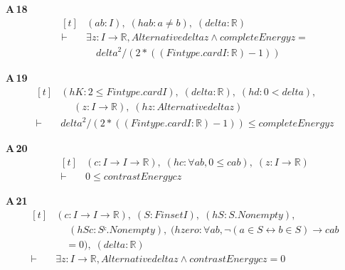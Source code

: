 \noindent\textbf{A\,18}\quad{}
{\footnotesize\[ \begin{aligned}[t]
&(\mathit{a} \mathit{b} : \mathit{I}),\; (\mathit{hab} : \mathit{a} \neq \mathit{b}),\; (\mathit{delta} : \mathbb{R} )\\
\vdash\;&\exists \mathit{z} : \mathit{I} \to \mathbb{R} ,\mathit{Alternative} \mathit{delta} \mathit{z} \wedge \mathit{completeEnergy} \mathit{z}=\\
&\quad \mathit{delta}^{2}/(2*((\mathit{Fintype}.\mathit{card} \mathit{I}:\mathbb{R} )-1))
\end{aligned} \]}

\noindent\textbf{A\,19}\quad{}
{\footnotesize\[ \begin{aligned}[t]
&(\mathit{hK} : 2 \leq \mathit{Fintype}.\mathit{card} \mathit{I}),\; (\mathit{delta} : \mathbb{R} ),\; (\mathit{hd} : 0 < \mathit{delta}),\\
&\quad \; (\mathit{z} : \mathit{I} \to \mathbb{R} ),\; (\mathit{hz} : \mathit{Alternative} \mathit{delta} \mathit{z})\\
\vdash\;&\mathit{delta}^{2}/(2*((\mathit{Fintype}.\mathit{card} \mathit{I}:\mathbb{R} )-1)) \leq \mathit{completeEnergy} \mathit{z}
\end{aligned} \]}

\noindent\textbf{A\,20}\quad{}
{\footnotesize\[ \begin{aligned}[t]
&(\mathit{c} : \mathit{I} \to \mathit{I} \to \mathbb{R} ),\; (\mathit{hc} : \forall \mathit{a} \mathit{b},0 \leq \mathit{c} \mathit{a} \mathit{b}),\; (\mathit{z} : \mathit{I} \to \mathbb{R} )\\
\vdash\;&0 \leq \mathit{contrastEnergy} \mathit{c} \mathit{z}
\end{aligned} \]}

\noindent\textbf{A\,21}\quad{}
{\footnotesize\[ \begin{aligned}[t]
&(\mathit{c} : \mathit{I} \to \mathit{I} \to \mathbb{R} ),\; (\mathit{S} : \mathit{Finset} \mathit{I}),\; (\mathit{hS} : \mathit{S}.\mathit{Nonempty}),\\
&\quad \; (\mathit{hSc} : \mathit{Sᶜ}.\mathit{Nonempty}),\; (\mathit{hzero} : \forall \mathit{a} \mathit{b},\neg (\mathit{a} \in \mathit{S} \leftrightarrow \mathit{b} \in \mathit{S}) \to \mathit{c} \mathit{a} \mathit{b}\\
&\quad =0),\; (\mathit{delta} : \mathbb{R} )\\
\vdash\;&\exists \mathit{z} : \mathit{I} \to \mathbb{R} ,\mathit{Alternative} \mathit{delta} \mathit{z} \wedge \mathit{contrastEnergy} \mathit{c} \mathit{z}=0
\end{aligned} \]}

